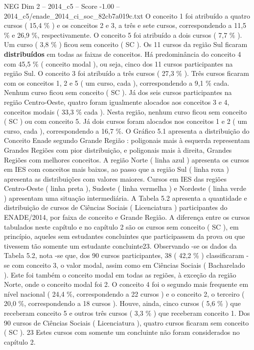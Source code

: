 \begin{textsample}{NEG Dim 2 – 2014\_c5 – Score -1.00 – 2014\_c5/enade\_2014\_ci\_soc\_82cb7a019c.txt}
O conceito 1 foi atribuído a quatro cursos ( 15,4 \% ) e os conceitos 2 e 3, a três e sete cursos, correspondendo a 11,5 \% e 26,9 \%, respectivamente.
O conceito 5 foi atribuído a dois cursos ( 7,7 \% ).
Um curso ( 3,8 \% ) ficou sem conceito ( SC ).
Os 11 cursos da região Sul ficaram \textbf{distribuídos} em todas as faixas de conceitos.
Há predominância do conceito 4 com 45,5 \% ( conceito modal ), ou seja, cinco dos 11 cursos participantes na região Sul.
O conceito 3 foi atribuído a três cursos ( 27,3 \% ).
Três cursos ficaram com os conceitos 1, 2 e 5 ( um curso, cada ), correspondendo a 9,1 \% cada.
Nenhum curso ficou sem conceito ( SC ).
Já dos seis cursos participantes na região Centro-Oeste, quatro foram igualmente alocados aos conceitos 3 e 4, conceitos modais ( 33,3 \% cada ).
Nesta região, nenhum curso ficou sem conceito ( SC ) ou com conceito 5.
Já dois cursos foram alocados nos conceitos 1 e 2 ( um curso, cada ), correspondendo a 16,7 \%.
O Gráfico 5.1 apresenta a distribuição do Conceito Enade segundo Grande Região : poligonais mais à esquerda representam Grandes Regiões com pior distribuição, e poligonais mais à direita, Grandes Regiões com melhores conceitos.
A região Norte ( linha azul ) apresenta os cursos em IES com conceitos mais baixos, ao passo que a região Sul ( linha roxa ) apresenta as distribuições com valores maiores.
Cursos em IES das regiões Centro-Oeste ( linha preta ), Sudeste ( linha vermelha ) e Nordeste ( linha verde ) apresentam uma situação intermediária.
A Tabela 5.2 apresenta a quantidade e distribuição de cursos de Ciências Sociais ( Licenciatura ) participantes do ENADE/2014, por faixa de conceito e Grande Região.
A diferença entre os cursos tabulados neste capítulo e no capítulo 2 são os cursos sem conceito ( SC ), em princípio, aqueles sem estudantes concluintes que participassem da prova ou que tivessem tão somente um estudante concluinte23.
Observando -se os dados da Tabela 5.2, nota -se que, dos 90 cursos participantes, 38 ( 42,2 \% ) classificaram -se com conceito 3, o valor modal, assim como em Ciências Sociais ( Bacharelado ).
Este foi também o conceito modal em todas as regiões, à exceção da região Norte, onde o conceito modal foi 2.
O conceito 4 foi o segundo mais frequente em nível nacional ( 24,4 \%, correspondendo a 22 cursos ) e o conceito 2, o terceiro ( 20,0 \%, correspondendo a 18 cursos ).
Houve, ainda, cinco cursos ( 5,6 \% ) que receberam conceito 5 e outros três cursos ( 3,3 \% ) que receberam conceito 1.
Dos 90 cursos de Ciências Sociais ( Licenciatura ), quatro cursos ficaram sem conceito ( SC ). 23 Estes cursos com somente um concluinte não foram considerados no capítulo 2.

\end{textsample}
